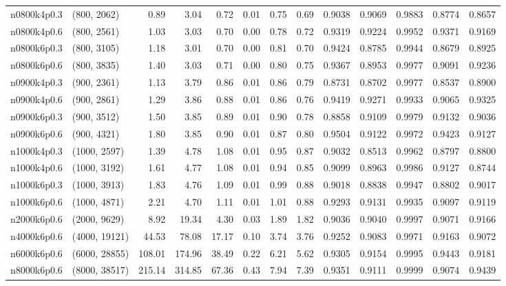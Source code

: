 \begin{tabular}{llrrrrrrrrrrr}
n0800k4p0.3 &   (800, 2062) &   0.89 &   3.04 &  0.72 & 0.01 &  0.75 &   0.69 &   0.9038 &   0.9069 &    0.9883 &     0.8774 &      0.8657 \\
n0800k4p0.6 &   (800, 2561) &   1.03 &   3.03 &  0.70 & 0.00 &  0.78 &   0.72 &   0.9319 &   0.9224 &    0.9952 &     0.9371 &      0.9169 \\
n0800k6p0.3 &   (800, 3105) &   1.18 &   3.01 &  0.70 & 0.00 &  0.81 &   0.70 &   0.9424 &   0.8785 &    0.9944 &     0.8679 &      0.8925 \\
n0800k6p0.6 &   (800, 3835) &   1.40 &   3.03 &  0.71 & 0.00 &  0.80 &   0.75 &   0.9367 &   0.8953 &    0.9977 &     0.9091 &      0.9236 \\
n0900k4p0.3 &   (900, 2361) &   1.13 &   3.79 &  0.86 & 0.01 &  0.86 &   0.79 &   0.8731 &   0.8702 &    0.9977 &     0.8537 &      0.8900 \\
n0900k4p0.6 &   (900, 2861) &   1.29 &   3.86 &  0.88 & 0.01 &  0.86 &   0.76 &   0.9419 &   0.9271 &    0.9933 &     0.9065 &      0.9325 \\
n0900k6p0.3 &   (900, 3512) &   1.50 &   3.85 &  0.89 & 0.01 &  0.90 &   0.78 &   0.8858 &   0.9109 &    0.9979 &     0.9132 &      0.9036 \\
n0900k6p0.6 &   (900, 4321) &   1.80 &   3.85 &  0.90 & 0.01 &  0.87 &   0.80 &   0.9504 &   0.9122 &    0.9972 &     0.9423 &      0.9127 \\
n1000k4p0.3 &  (1000, 2597) &   1.39 &   4.78 &  1.08 & 0.01 &  0.95 &   0.87 &   0.9032 &   0.8513 &    0.9962 &     0.8797 &      0.8800 \\
n1000k4p0.6 &  (1000, 3192) &   1.61 &   4.77 &  1.08 & 0.01 &  0.94 &   0.85 &   0.9099 &   0.8963 &    0.9986 &     0.9127 &      0.8744 \\
n1000k6p0.3 &  (1000, 3913) &   1.83 &   4.76 &  1.09 & 0.01 &  0.99 &   0.88 &   0.9018 &   0.8838 &    0.9947 &     0.8802 &      0.9017 \\
n1000k6p0.6 &  (1000, 4871) &   2.21 &   4.70 &  1.11 & 0.01 &  1.01 &   0.88 &   0.9293 &   0.9131 &    0.9935 &     0.9097 &      0.9119 \\
n2000k6p0.6 &  (2000, 9629) &   8.92 &  19.34 &  4.30 & 0.03 &  1.89 &   1.82 &   0.9036 &   0.9040 &    0.9997 &     0.9071 &      0.9166 \\
n4000k6p0.6 & (4000, 19121) &  44.53 &  78.08 & 17.17 & 0.10 &  3.74 &   3.76 &   0.9252 &   0.9083 &    0.9971 &     0.9163 &      0.9072 \\
n6000k6p0.6 & (6000, 28855) & 108.01 & 174.96 & 38.49 & 0.22 &  6.21 &   5.62 &   0.9305 &   0.9154 &    0.9995 &     0.9443 &      0.9181 \\
n8000k6p0.6 & (8000, 38517) & 215.14 & 314.85 & 67.36 & 0.43 &  7.94 &   7.39 &   0.9351 &   0.9111 &    0.9999 &     0.9074 &      0.9439 \\
\bottomrule
\end{tabular}
